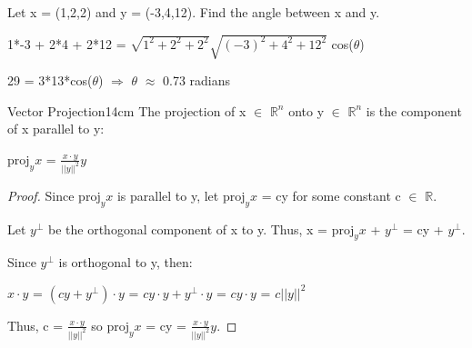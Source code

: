     \begin{example}
        Let x = (1,2,2) and y = (-3,4,12). Find the angle between x and y.
    \end{example}

    \begin{tbox}
        1*-3 + 2*4 + 2*12
        = $\sqrt{1^2 + 2^2 + 2^2} \sqrt{(-3)^2 + 4^2 + 12^2}$ cos($\theta$)

        29 = 3*13*cos($\theta$)
        \hspace{1cm}
        $\Rightarrow$
        \hspace{1cm}
        $\theta$ $\approx$ 0.73 radians
    \end{tbox}

    \newpage



    \begin{wtheorem}{Vector Projection}{14cm}
        The projection of x $\in$ $\mathbb{R}^n$ onto y $\in$ $\mathbb{R}^n$
        is the component of x parallel to y:

        \hspace{0.5cm}
        $\text{proj}_yx$ = $\frac{x \cdot y}{||y||^2}y$
    \end{wtheorem}

    \begin{proof}
        Since $\text{proj}_yx$ is parallel to y, let
        $\text{proj}_yx$ = cy for some constant c $\in$ $\mathbb{R}$.

        Let $y^{\perp}$ be the orthogonal component of x to y.
        Thus, x = $\text{proj}_yx$ + $y^{\perp}$ = cy + $y^{\perp}$.

        Since $y^{\perp}$ is orthogonal to y, then:

        \hspace{0.5cm}
        $x \cdot y$
        = $(cy + y^{\perp}) \cdot y$
        = $cy \cdot y + y^{\perp} \cdot y$
        = $c y \cdot y$
        = $c||y||^2$

        Thus, c = $\frac{x \cdot y}{||y||^2}$
        so $\text{proj}_yx$ = cy = $\frac{x \cdot y}{||y||^2}y$.
    \end{proof}


